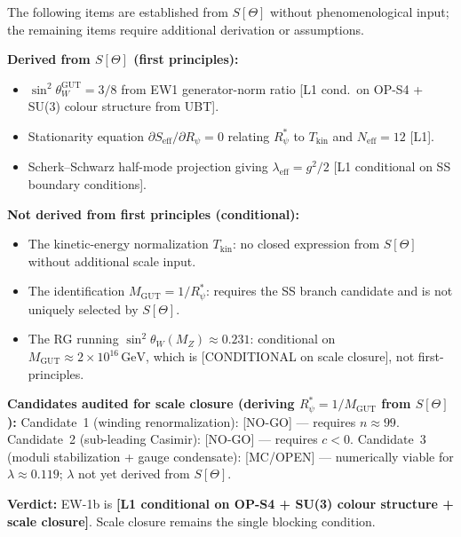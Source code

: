 \documentclass[12pt,a4paper]{article}
\theoremstyle{remark}
\begin{document}
\begin{proposition}
\label{prop:rpsi_scale_status}
The following items are established from $S[\Theta]$ without phenomenological
input; the remaining items require additional derivation or assumptions.

\medskip
\noindent\textbf{Derived from $S[\Theta]$ (first principles):}
\begin{itemize}
  \item $\sin^2\theta_W^{\mathrm{GUT}}=3/8$ from EW1 generator-norm ratio
    [L1 cond.\ on OP-S4 + SU(3) colour structure from UBT].
  \item Stationarity equation $\partial S_{\mathrm{eff}}/\partial R_\psi=0$
    relating $R_\psi^*$ to $T_{\mathrm{kin}}$ and $N_{\mathrm{eff}}=12$ [L1].
  \item Scherk--Schwarz half-mode projection giving
    $\lambda_{\mathrm{eff}}=g^2/2$ [L1 conditional on SS boundary conditions].
\end{itemize}

\noindent\textbf{Not derived from first principles (conditional):}
\begin{itemize}
  \item The kinetic-energy normalization $T_{\mathrm{kin}}$: no closed expression
    from $S[\Theta]$ without additional scale input.
  \item The identification $M_{\mathrm{GUT}}=1/R_\psi^*$: requires the SS branch
    candidate and is not uniquely selected by $S[\Theta]$.
  \item The RG running $\sin^2\theta_W(M_Z)\approx0.231$: conditional on
    $M_{\mathrm{GUT}}\approx2\times10^{16}\,\mathrm{GeV}$, which is
    [CONDITIONAL on scale closure], not first-principles.
\end{itemize}

\noindent\textbf{Candidates audited for scale closure (deriving $R_\psi^*=1/M_{\mathrm{GUT}}$ from $S[\Theta]$):}
Candidate~1 (winding renormalization): [NO-GO] — requires $n\approx99$.
Candidate~2 (sub-leading Casimir): [NO-GO] — requires $c<0$.
Candidate~3 (moduli stabilization + gauge condensate): [MC/OPEN] —
numerically viable for $\lambda\approx0.119$; $\lambda$ not yet derived from $S[\Theta]$.

\noindent\textbf{Verdict:} EW-1b is
\textbf{[L1 conditional on OP-S4 + SU(3) colour structure + scale closure]}.
Scale closure remains the single blocking condition.
\end{proposition}
\end{document}
